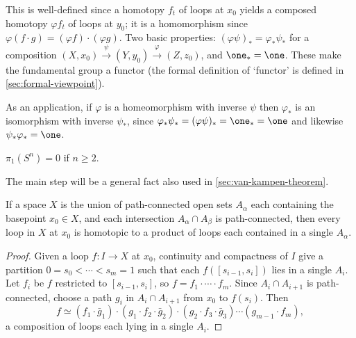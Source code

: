 This is well-defined since a homotopy $f_t$ of loops at $x_0$ yields a composed
homotopy $\varphi f_t$ of loops at $y_0$; it is a homomorphism since
$\varphi(f\cdot g) = (\varphi f)\cdot(\varphi g)$. Two basic properties: $(\varphi\psi)_* = \varphi_*\psi_*$ for a
composition $(X,x_0)\xrightarrow{\psi}(Y,y_0)\xrightarrow{\varphi}(Z,z_0)$, and $\one_* = \one$. These make
the fundamental group a functor (the formal definition of `functor' is defined in
\cref{sec:formal-viewpoint}).

As an application, if $\varphi$ is a homeomorphism with inverse $\psi$ then $\varphi_*$ is an
isomorphism with inverse $\psi_*$, since $\varphi_*\psi_* = (\varphi\psi)_* = \one_* = \one$ and likewise
$\psi_*\varphi_* = \one$.

\begin{proposition}[$\pi_1(S^n) = 0$ for $n \ge 2$]
\label{prop:pi1-sphere-trivial-n-geq-2}
$\pi_1(S^n) = 0$ if $n \ge 2$.
\end{proposition}

The main step will be a general fact also used in \cref{sec:van-kampen-theorem}.

\begin{lemma}
\label{lem:loop-decomposition-open-cover}
If a space $X$ is the union of path-connected open sets $A_\alpha$ each containing the
basepoint $x_0 \in X$, and each intersection $A_\alpha \cap A_\beta$ is path-connected, then every
loop in $X$ at $x_0$ is homotopic to a product of loops each contained in a single
$A_\alpha$.
\end{lemma}

\begin{proof}
Given a loop $f : I \to X$ at $x_0$, continuity and compactness of $I$ give a partition
$0=s_0<\cdots<s_m=1$ such that each $f([s_{i-1},s_i])$ lies in a single $A_i$. Let $f_i$ be
$f$ restricted to $[s_{i-1},s_i]$, so $f = f_1\cdot\cdots\cdot f_m$. Since $A_i\cap A_{i+1}$ is
path-connected, choose a path $g_i$ in $A_i\cap A_{i+1}$ from $x_0$ to $f(s_i)$. Then
\[
f \simeq (f_1\cdot\bar g_1)\cdot(g_1\cdot f_2\cdot\bar g_2)\cdot(g_2\cdot f_3\cdot\bar g_3)\cdots(g_{m-1}\cdot f_m),
\]
a composition of loops each lying in a single $A_i$.
\end{proof}



